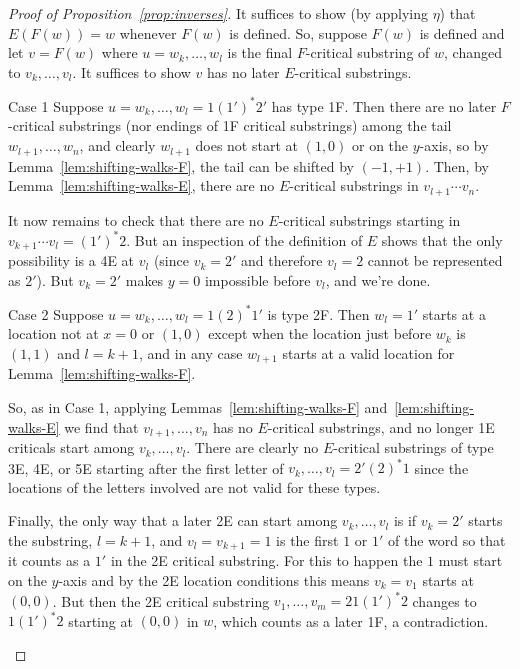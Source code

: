\documentclass[10pt]{amsart}
\theoremstyle{definition}
\begin{document}
\begin{proof}[Proof of Proposition~\ref{prop:inverses}]
It suffices to show (by applying $\eta$) that $E(F(w)) = w$ whenever $F(w)$ is defined. So, suppose $F(w)$ is defined and let $v=F(w)$ where $u=w_k,\ldots, w_l$ is the final $F$-critical substring of $w$, changed to $v_k,\ldots, v_l$. It suffices to show $v$ has no later $E$-critical substrings.


\begin{enonce*}[remark]{Case 1} Suppose $u=w_k,\ldots,w_l=1(1')^\ast 2'$ has type 1F. Then there are no later $F$-critical substrings (nor endings of 1F critical substrings) among the tail $w_{l+1},\ldots,w_n$, and clearly $w_{l+1}$ does not start at $(1,0)$ or on the $y$-axis, so by Lemma~\ref{lem:shifting-walks-F}, the tail can be shifted by $(-1,+1)$. Then, by Lemma~\ref{lem:shifting-walks-E}, there are no $E$-critical substrings in $v_{l+1} \cdots v_n$. 

It now remains to check that there are no $E$-critical substrings starting in $v_{k+1} \cdots v_l = (1')^*2$. But an inspection of the definition of $E$ shows that the only possibility is a 4E at $v_l$ (since $v_k=2'$ and therefore $v_l=2$ cannot be represented as $2'$). But $v_k=2'$ makes $y=0$ impossible before $v_l$, and we're done.
\end{enonce*}

\begin{enonce*}[remark]{Case 2} Suppose $u=w_k,\ldots,w_l=1(2)^\ast 1'$ is type 2F. Then $w_l=1'$ starts at a location not at $x=0$ or $(1,0)$ except when the location just before $w_k$ is $(1,1)$ and $l=k+1$, and in any case $w_{l+1}$ starts at a valid location for Lemma~\ref{lem:shifting-walks-F}. 

So, as in Case 1, applying Lemmas~\ref{lem:shifting-walks-F} and~\ref{lem:shifting-walks-E} we find that $v_{l+1},\ldots,v_n$ has no $E$-critical substrings, and no longer 1E criticals start among $v_k,\ldots,v_l$. There are clearly no $E$-critical substrings of type 3E, 4E, or 5E starting after the first letter of $v_k,\ldots,v_{l}=2'(2)^\ast 1$ since the locations of the letters involved are not valid for these types. 

Finally, the only way that a later 2E can start among $v_k,\ldots,v_l$ is if $v_k=2'$ starts the substring, $l=k+1$, and $v_l=v_{k+1}=1$ is the first $1$ or $1'$ of the word so that it counts as a $1'$ in the 2E critical substring. For this to happen the $1$ must start on the $y$-axis and by the 2E location conditions this means $v_k=v_1$ starts at $(0,0)$. But then the 2E critical substring $v_1,\ldots,v_m=21(1')^\ast 2$ changes to $1(1')^\ast 2$ starting at $(0,0)$ in $w$, which counts as a later 1F, a contradiction. 
\end{enonce*}


\end{proof}
\end{document}
